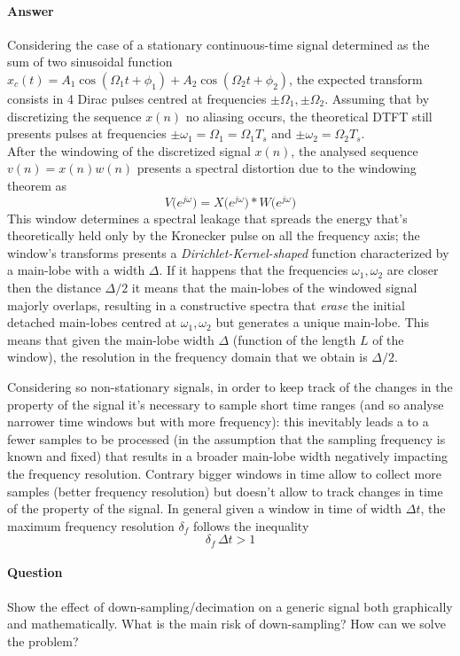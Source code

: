 	\paragraph{Answer} Considering the case of a stationary continuous-time signal determined as the sum of two sinusoidal function $x_c(t) = A_1\cos(\Omega_1t + \phi_1) + A_2 \cos(\Omega_2 t + \phi_2)$, the expected transform consists in 4 Dirac pulses centred at frequencies $\pm \Omega_1,\pm \Omega_2$. Assuming that by discretizing the sequence $x(n)$ no aliasing  occurs, the theoretical DTFT still presents pulses at frequencies $\pm \omega_1 = \Omega_1 = \Omega_1 T_s$ and $\pm \omega_2 = \Omega_2 T_s$. \\
	After the windowing of the discretized signal $x(n)$, the analysed sequence $v(n) = x(n) w(n)$ presents a spectral distortion due to the windowing theorem as
	\[ V\big(e^{j\omega}\big) = X\big(e^{j\omega}\big) * W\big(e^{j\omega}\big)  \]
	This window determines a spectral leakage that spreads the energy that's theoretically held only by the Kronecker pulse on all the frequency axis; the window's transforms presents a \textit{Dirichlet-Kernel-shaped} function characterized by a main-lobe with a width $\Delta$. If it happens that the frequencies $\omega_1,\omega_2$ are closer then the distance $\Delta/2$ it means that the main-lobes of the windowed signal majorly overlaps, resulting in a constructive spectra that \textit{erase} the initial detached main-lobes centred at $\omega_1,\omega_2$ but generates a unique main-lobe. This means that given the main-lobe width $\Delta$ (function of the length $L$ of the window), the resolution in the frequency domain that we obtain is $\Delta/2$.
	
	Considering so non-stationary signals, in order to keep track of the changes in the property of the signal it's necessary to sample short time ranges (and so analyse narrower time windows but with more frequency): this inevitably leads a to a fewer samples to be processed (in the assumption that the sampling frequency is known and fixed) that results in a broader main-lobe width negatively impacting the frequency resolution. Contrary bigger windows in time allow to collect more samples (better frequency resolution) but doesn't allow to track changes in time of the property of the signal. In general given a window in time of width $\Delta t$, the maximum frequency resolution $\delta_f$ follows the inequality
	\[ \delta_f \, \Delta t > 1  \]
	
\newquestion
	\paragraph{Question} Show the effect of down-sampling/decimation on a generic signal both graphically and mathematically.	What is the main risk of down-sampling? How can we solve the problem?
	
